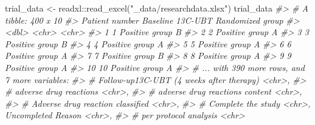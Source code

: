 \documentclass[
]{book}
\newenvironment{Shaded}{\begin{snugshade}}{\end{snugshade}}
\newcommand{\CommentTok}[1]{\textcolor[rgb]{0.56,0.35,0.01}{\textit{#1}}}
\newcommand{\FunctionTok}[1]{\textcolor[rgb]{0.00,0.00,0.00}{#1}}
\newcommand{\NormalTok}[1]{#1}
\newcommand{\OtherTok}[1]{\textcolor[rgb]{0.56,0.35,0.01}{#1}}
\newcommand{\SpecialCharTok}[1]{\textcolor[rgb]{0.00,0.00,0.00}{#1}}
\newcommand{\StringTok}[1]{\textcolor[rgb]{0.31,0.60,0.02}{#1}}
\begin{document}
\begin{Shaded}
\begin{Highlighting}[]
\NormalTok{trial\_data }\OtherTok{\textless{}{-}}\NormalTok{ readxl}\SpecialCharTok{::}\FunctionTok{read\_excel}\NormalTok{(}\StringTok{"\_data/researchdata.xlsx"}\NormalTok{)}
\NormalTok{trial\_data}
\CommentTok{\#\textgreater{} \# A tibble: 400 x 10}
\CommentTok{\#\textgreater{}    \textasciigrave{}Patient number\textasciigrave{} \textasciigrave{}Baseline 13C{-}UBT\textasciigrave{} \textasciigrave{}Randomized group\textasciigrave{}}
\CommentTok{\#\textgreater{}               \textless{}dbl\textgreater{} \textless{}chr\textgreater{}              \textless{}chr\textgreater{}             }
\CommentTok{\#\textgreater{}  1                1 Positive           group B           }
\CommentTok{\#\textgreater{}  2                2 Positive           group A           }
\CommentTok{\#\textgreater{}  3                3 Positive           group B           }
\CommentTok{\#\textgreater{}  4                4 Positive           group A           }
\CommentTok{\#\textgreater{}  5                5 Positive           group A           }
\CommentTok{\#\textgreater{}  6                6 Positive           group A           }
\CommentTok{\#\textgreater{}  7                7 Positive           group B           }
\CommentTok{\#\textgreater{}  8                8 Positive           group A           }
\CommentTok{\#\textgreater{}  9                9 Positive           group A           }
\CommentTok{\#\textgreater{} 10               10 Positive           group A           }
\CommentTok{\#\textgreater{} \# ... with 390 more rows, and 7 more variables:}
\CommentTok{\#\textgreater{} \#   \textasciigrave{}Follow{-}up13C{-}UBT (4 weeks after therapy)\textasciigrave{} \textless{}chr\textgreater{},}
\CommentTok{\#\textgreater{} \#   \textasciigrave{}adverse drug reactions\textasciigrave{} \textless{}chr\textgreater{},}
\CommentTok{\#\textgreater{} \#   \textasciigrave{}adverse drug reactions  content\textasciigrave{} \textless{}chr\textgreater{},}
\CommentTok{\#\textgreater{} \#   \textasciigrave{}Adverse drug reaction classified\textasciigrave{} \textless{}chr\textgreater{},}
\CommentTok{\#\textgreater{} \#   \textasciigrave{}Complete the study\textasciigrave{} \textless{}chr\textgreater{}, \textasciigrave{}Uncompleted Reason\textasciigrave{} \textless{}chr\textgreater{},}
\CommentTok{\#\textgreater{} \#   \textasciigrave{}per protocol analysis\textasciigrave{} \textless{}chr\textgreater{}}
\end{Highlighting}
\end{Shaded}
\end{document}
